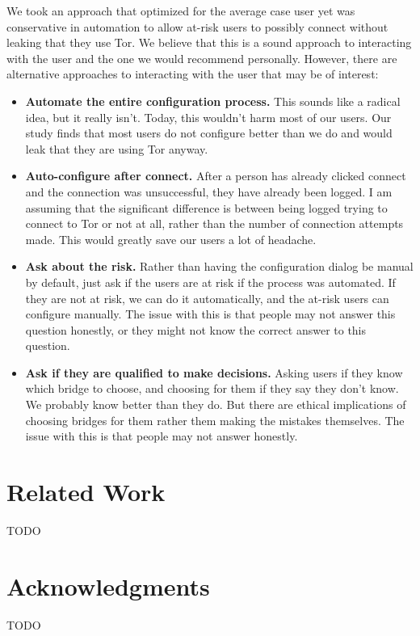 \documentclass{template}
\begin{document}
We took an approach that optimized for the average case user yet was conservative in automation to allow at-risk users to possibly connect without leaking that they use Tor. We believe that this is a sound approach to interacting with the user and the one we would recommend personally. However, there are alternative approaches to interacting with the user that may be of interest:  
\begin{itemize} \itemsep1pt \parskip0pt  
\item{\bfseries Automate the entire configuration process.} This sounds like a radical idea, but it really isn't. Today, this wouldn't harm most of our users. Our study finds that most users do not configure better than we do and would leak that they are using Tor anyway. 
\item {\bfseries Auto-configure after connect.} After a person has already clicked connect and the connection was unsuccessful, they have already been logged. I am assuming that the significant difference is between being logged trying to connect to Tor or not at all, rather than the number of connection attempts made. This would greatly save our users a lot of headache. 
\item{\bfseries Ask about the risk.} Rather than having the configuration dialog be manual by default, just ask if the users are at risk if the process was automated. If they are not at risk, we can do it automatically, and the at-risk users can configure manually. The issue with this is that people may not answer this question honestly, or they might not know the correct answer to this question. 
\item{\bfseries Ask if they are qualified to make decisions.} Asking users if they know which bridge to choose, and choosing for them if they say they don't know. We probably know better than they do. But there are ethical implications of choosing bridges for them rather them making the mistakes themselves. The issue with this is that people may not answer honestly. 
\end{itemize}


\section{Related Work} 
{\color {red} TODO} 

\section {Acknowledgments}
{\color {red} TODO} 
\end{document}
